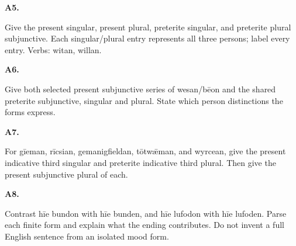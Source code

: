 \par\begin{minipage}{\linewidth}\raggedright
\textbf{A5.}

Give the present singular, present plural, preterite singular, and preterite plural subjunctive. Each singular/\allowbreak{}plural entry represents all three persons; label every entry. Verbs: witan, willan.

\end{minipage}\par\addvspace{4pt}

\par\begin{minipage}{\linewidth}\raggedright
\textbf{A6.}

Give both selected present subjunctive series of wesan/\allowbreak{}bēon and the shared preterite subjunctive, singular and plural. State which person distinctions the forms express.

\end{minipage}\par\addvspace{4pt}

\par\begin{minipage}{\linewidth}\raggedright
\textbf{A7.}

For gīeman, rīcsian, gemanigfieldan, tōtwǣman, and wyrcean, give the present indicative third singular and preterite indicative third plural. Then give the present subjunctive plural of each.

\end{minipage}\par\addvspace{4pt}

\par\begin{minipage}{\linewidth}\raggedright
\textbf{A8.}

Contrast hīe bundon with hīe bunden, and hīe lufodon with hīe lufoden. Parse each finite form and explain what the ending contributes. Do not invent a full English sentence from an isolated mood form.

\end{minipage}\par\addvspace{4pt}

